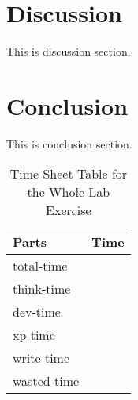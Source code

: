 \documentclass[10pt, a4paper, twoside, twocolumn, technote]{IEEEtran}
\begin{document}
\section{Discussion}\label{discussion}
This is discussion section.

\section{Conclusion}\label{conclusion}
This is conclusion section.

\begin{table}
  \caption{Time Sheet Table for the Whole Lab Exercise}
  \centering
  \begin{tabular}{l|l}
    \hline
    Parts       & Time \\
    \hline
    total-time  & \\
    think-time  & \\
    dev-time    & \\
    xp-time     & \\
    write-time  & \\
    wasted-time & \\
    \hline
  \end{tabular}
\end{table}



\end{document}
